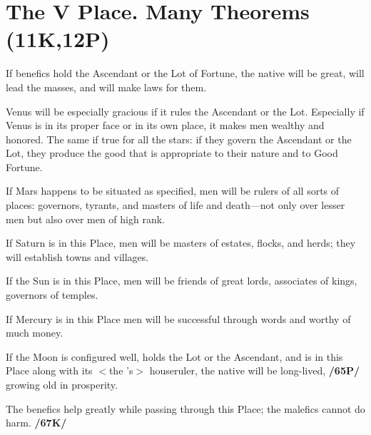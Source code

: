 \section{The V Place. Many Theorems (11K,12P)}

If benefics hold the Ascendant or the Lot of Fortune, the native will be great, will lead the masses, and will make laws for them.

Venus will be especially gracious if it rules the Ascendant or the Lot. Especially if Venus is in its proper face or in its own place, it makes men wealthy and honored. \mndl The same if true for all the stars: if they govern the Ascendant or the Lot, they produce the good that is appropriate to their nature and to Good Fortune. 

If Mars happens to be situated as specified, men will be rulers of all sorts of places: governors, tyrants, and masters of life and death—not only over lesser men but also over men of
high rank. 

If Saturn is in this Place, men will be masters of estates, flocks, and herds; they will establish towns and villages. 

If the Sun is in this Place, men will be friends of great lords, associates of kings, governors of temples. 

If Mercury is in this Place men will be successful through words and worthy of much money. 

If the Moon is configured well, holds the Lot or the Ascendant, and is in this Place along with its $<$the \Moon’s$>$ houseruler, the native will be long-lived, \textbf{/65P/} growing old in prosperity. 

\mndl The benefics help greatly while passing through this Place; the malefics cannot do harm. \textbf{/67K/}

\newpage
